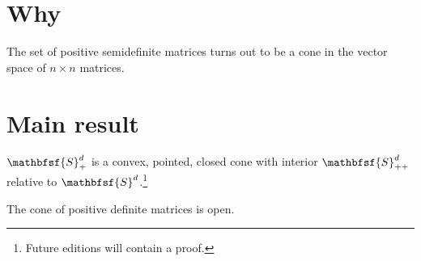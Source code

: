 
\section*{Why}

The set of positive semidefinite matrices turns out to be a cone in the vector space of $n \times  n$ matrices.

\section*{Main result}

\begin{proposition}
$\mathbfsf{S} _+^d$ is a convex, pointed, closed cone with interior $\mathbfsf{S} _{++}^d$ relative to $\mathbfsf{S} ^d$.\footnote{Future editions will contain a proof.}
\end{proposition}

The cone of positive definite matrices is open.

\blankpage